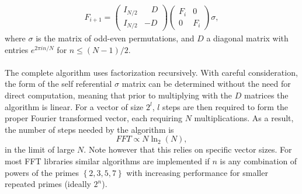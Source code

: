 \documentclass[reprint,aps,prb]{revtex4-2}
\begin{document}
\begin{align}
	F_{i+1}=
	\begin{pmatrix}
		I_{N/2} &\;\;\;D \\
		I_{N/2} &-D 
	\end{pmatrix}
	\begin{pmatrix}
		F_{i} & 0 \\
		0 & F_{i}
	\end{pmatrix}
		\sigma,
		\nonumber
\end{align}
where $\sigma$ is the matrix of odd-even permutations, and $D$ a diagonal matrix with entries $e^{2\pi i n/N}$ for $n\leq \left(N-1\right)/2$.\\ \\
The complete algorithm uses factorization recursively. With careful consideration, the form of the self referential $\sigma$ matrix can be determined without the need for direct computation, meaning that prior to multiplying with the $D$ matrices the algorithm is linear. For a vector of size $2^{l}$, $l$ steps are then required to form the proper Fourier transformed vector, each requiring $N$ multiplications. As a result, the number of steps needed by the algorithm is  
$$FFT\propto N\ln_{2}\left(N\right),$$
in the limit of large $N$. Note however that this relies on specific vector sizes. For most FFT libraries similar algorithms are implemented if $n$ is any combination of powers of the primes $\left\{2,3,5,7\right\}$ with increasing performance for smaller repeated primes (ideally $2^{n}$).
\end{document}
